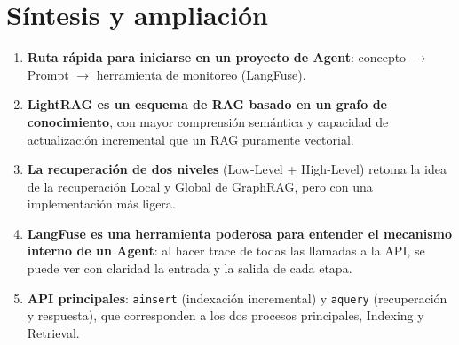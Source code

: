 \section{Síntesis y ampliación}

\begin{enumerate}
    \item \textbf{Ruta rápida para iniciarse en un proyecto de Agent}: concepto $\rightarrow$ Prompt $\rightarrow$ herramienta de monitoreo (LangFuse).
    \item \textbf{LightRAG es un esquema de RAG basado en un grafo de conocimiento}, con mayor comprensión semántica y capacidad de actualización incremental que un RAG puramente vectorial.
    \item \textbf{La recuperación de dos niveles} (Low-Level + High-Level) retoma la idea de la recuperación Local y Global de GraphRAG, pero con una implementación más ligera.
    \item \textbf{LangFuse es una herramienta poderosa para entender el mecanismo interno de un Agent}: al hacer trace de todas las llamadas a la API, se puede ver con claridad la entrada y la salida de cada etapa.
    \item \textbf{API principales}: \texttt{ainsert} (indexación incremental) y \texttt{aquery} (recuperación y respuesta), que corresponden a los dos procesos principales, Indexing y Retrieval.
\end{enumerate}


